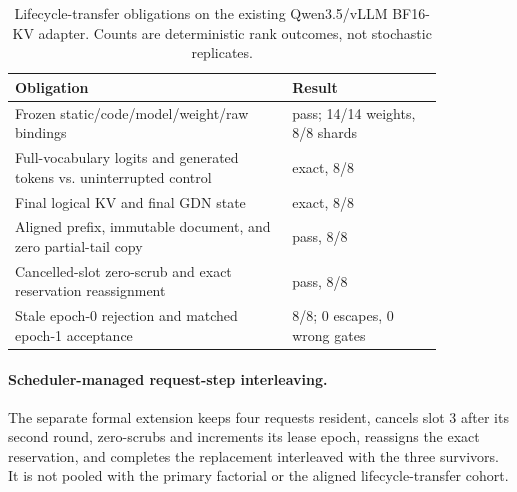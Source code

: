 \documentclass{article}
\begin{document}
\begin{table}[H]
\caption{Lifecycle-transfer obligations on the existing Qwen3.5/vLLM BF16-KV
adapter.  Counts are deterministic rank outcomes, not stochastic replicates.}
\label{tab:lifecycle-transfer}
\centering\small
\begin{tabular}{@{}p{0.55\linewidth}p{0.30\linewidth}@{}}
\toprule
Obligation & Result \\
\midrule
Frozen static/code/model/weight/raw bindings & pass; 14/14 weights, 8/8 shards \\
Full-vocabulary logits and generated tokens vs. uninterrupted control & exact, 8/8 \\
Final logical KV and final GDN state & exact, 8/8 \\
Aligned prefix, immutable document, and zero partial-tail copy & pass, 8/8 \\
Cancelled-slot zero-scrub and exact reservation reassignment & pass, 8/8 \\
Stale epoch-0 rejection and matched epoch-1 acceptance & 8/8; 0 escapes, 0 wrong gates \\
\bottomrule
\end{tabular}
\end{table}

\paragraph{Scheduler-managed request-step interleaving.}
The separate formal extension keeps four requests resident, cancels slot 3
after its second round, zero-scrubs and increments its lease epoch, reassigns
the exact reservation, and completes the replacement interleaved with the
three survivors.  It is not pooled with the primary factorial or the aligned
lifecycle-transfer cohort.
\end{document}

